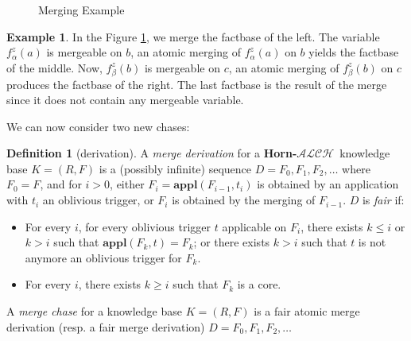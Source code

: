 \documentclass{article}
\theoremstyle{definition}
\newtheorem{definition}{Definition}[section]
\newtheorem{example}{Example}[section]
\theoremstyle{remark}
\newcommand{\Appl}{\textbf{appl}}
\newcommand{\ALCH}{\textbf{Horn-$\mathcal{ALCH}$}}
\begin{document}
\begin{figure}
\begin{center}
\end{center}
\caption{Merging Example}
\label{figure:merging}
\end{figure}


\begin{example} \label{example: merging}
In the Figure \ref{figure:merging}, we merge the factbase of the left. The variable $f_\alpha^z(a)$ is mergeable on $b$, an atomic merging of $f_\alpha^z(a)$ on $b$ yields the factbase of the middle. Now, $f_\beta^z(b)$ is mergeable on $c$, an atomic merging of $f_\beta^z(b)$ on $c$ produces the factbase of the right. The last factbase is the result of the merge since it does not contain any mergeable variable.

\end{example}



We can now consider two new chases:

\begin{definition}[derivation]
A \emph{merge derivation} for a \ALCH\ knowledge base $K = (R,F)$ is a (possibly infinite) sequence $D = F_0, F_1, F_2, \ldots$ where $F_0 = F$, and for $i >0$, either $F_{i}= \Appl(F_{i-1},t_i)$ is obtained by an application with $t_i$ an oblivious trigger, or $F_i$ is obtained by the merging of $F_{i-1}$. $D$ is \emph{fair} if: 
\begin{itemize}
\item For every $i$, for every oblivious trigger $t$ applicable on $F_i$, there exists $k \leq i$ or $k > i$ such that $\Appl(F_{k},t) = F_k$; or there exists $k > i$ such that $t$ is not anymore an oblivious trigger for $F_k$.
\item For every $i$, there exists $k \geq i$ such that $F_k$ is a core.
\end{itemize}

A \emph{merge chase} for a knowledge base $K= (R,F)$ is a fair atomic merge derivation (resp. a fair merge derivation) $D=F_0,F_1,F_2,\ldots$
\end{definition}
\end{document}

